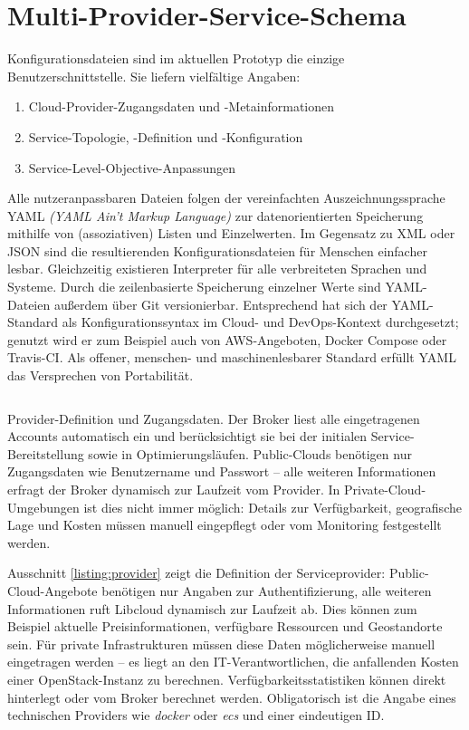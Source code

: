 \section{Multi-Provider-Service-Schema}

Konfigurationsdateien sind im aktuellen Prototyp die einzige Benutzerschnittstelle. Sie liefern vielfältige Angaben: 

\begin{enumerate}
	\item Cloud-Provider-Zugangsdaten und -Metainformationen
	\item Service-Topologie, -Definition und -Konfiguration
	\item Service-Level-Objective-Anpassungen
\end{enumerate}

Alle nutzeranpassbaren Dateien folgen der vereinfachten Auszeichnungssprache YAML \emph{(YAML Ain't Markup Language)} zur datenorientierten Speicherung mithilfe von (assoziativen) Listen und Einzelwerten. Im Gegensatz zu XML oder JSON sind die resultierenden Konfigurationsdateien für Menschen einfacher lesbar. Gleichzeitig existieren Interpreter für alle verbreiteten Sprachen und Systeme. Durch die zeilenbasierte Speicherung einzelner Werte sind YAML-Dateien außerdem über Git versionierbar. Entsprechend hat sich der YAML-Standard als Konfigurationssyntax im Cloud- und DevOps-Kontext durchgesetzt; genutzt wird er zum Beispiel auch von AWS-Angeboten, Docker Compose oder Travis-CI. Als offener, menschen- und maschinenlesbarer Standard erfüllt YAML das Versprechen von Portabilität.

\begin{listing}[ht]	
	\inputminted[]{yaml}{./src/provider.sample.yaml}
	\caption{Provider-Definition und Zugangsdaten. Der Broker liest alle eingetragenen Accounts automatisch ein und berücksichtigt sie bei der initialen Service-Bereitstellung sowie in Optimierungsläufen. Public-Clouds benötigen nur Zugangsdaten wie Benutzername und Passwort -- alle weiteren Informationen erfragt der Broker dynamisch zur Laufzeit vom Provider. In Private-Cloud-Umgebungen ist dies nicht immer möglich: Details zur Verfügbarkeit, geografische Lage und Kosten müssen manuell eingepflegt oder vom Monitoring festgestellt werden.}
	\label{listing:provider}
\end{listing}

Ausschnitt \ref{listing:provider} zeigt die Definition der Serviceprovider: Public-Cloud-Angebote benötigen nur Angaben zur Authentifizierung, alle weiteren Informationen ruft Libcloud dynamisch zur Laufzeit ab. Dies können zum Beispiel aktuelle Preisinformationen, verfügbare Ressourcen und Geostandorte sein. Für private Infrastrukturen müssen diese Daten möglicherweise manuell eingetragen werden -- es liegt an den IT-Verantwortlichen, die anfallenden Kosten einer OpenStack-Instanz zu berechnen. Verfügbarkeitsstatistiken können direkt hinterlegt oder vom Broker berechnet werden. Obligatorisch ist die Angabe eines technischen Providers wie \emph{docker} oder \emph{ecs} und einer eindeutigen ID.

